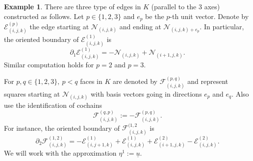 \documentclass[fleqn]{article}
\theoremstyle{definition}
\newtheorem{example}[theorem]{Example}
\begin{document}
\begin{example}
  There are three type of edges in $K$ (parallel to the $3$ axes)
  constructed as follows.
  Let $p \in \{1, 2, 3\}$ and $e_p$ be the $p$-th unit vector.
  Denote by $\mathcal{E}^{(p)}_{(i, j, k)}$ the edge starting at
  $\mathcal{N}_{(i, j, k)}$ and ending at $\mathcal{N}_{(i, j, k) + e_p}$.
  In particular, the oriented boundary of $\mathcal{E}^{(1)}_{(i, j, k)}$ is
  \begin{equation}
    \partial_1 \mathcal{E}^{(1)}_{(i, j, k)} =
    - \mathcal{N}_{(i, j, k)} + \mathcal{N}_{(i + 1, j, k)}.
  \end{equation}
  Similar computation holds for $p = 2$ and $p = 3$.

  For $p, q \in \{1, 2, 3\},\ p < q$ faces in $K$ are denoted by
  $\mathcal{F}^{(p, q)}_{(i, j, k)}$ and represent squares starting at
  $\mathcal{N}_{(i, j, k)}$ with basis vectors going in directions
  $e_p$ and $e_q$.
  Also use the identification of cochains
  \begin{equation}
    \mathcal{F}^{(q, p)}_{(i, j, k)} := -\mathcal{F}^{(p, q)}_{(i, j, k)}.
  \end{equation}
  For instance, the oriented boundary of $\mathcal{F}^{(1, 2}_{(i, j, k)}$ is
  \begin{equation}
    \partial_2 \mathcal{F}^{(1, 2)}_{(i, j, k)} =
    - \mathcal{E}^{(1)}_{(i, j + 1, k)}
    + \mathcal{E}^{(1)}_{(i, j, k)}
    + \mathcal{E}^{(2)}_{(i + 1, j, k)}
    - \mathcal{E}^{(2)}_{(i, j, k)}.
  \end{equation}
  We will work with the approximation $\eta^1 := \underline{u}$.
  

\end{example}
\end{document}
